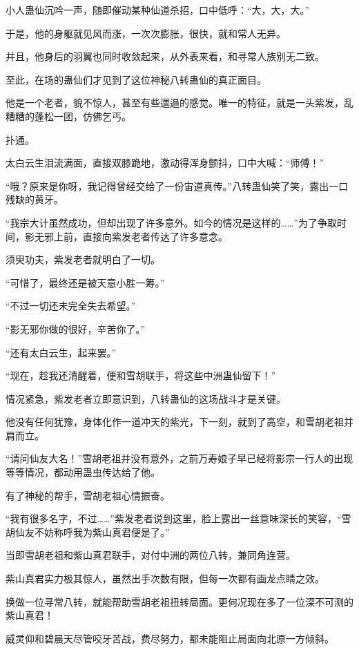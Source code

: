 
\begin{this_body}

小人蛊仙沉吟一声，随即催动某种仙道杀招，口中低呼：“大，大，大。”

于是，他的身躯就见风而涨，一次次膨胀，很快，就和常人无异。

并且，他身后的羽翼也同时收敛起来，从外表来看，和寻常人族别无二致。

至此，在场的蛊仙们才见到了这位神秘八转蛊仙的真正面目。

他是一个老者，貌不惊人，甚至有些邋遢的感觉。唯一的特征，就是一头紫发，乱糟糟的蓬松一团，仿佛乞丐。

扑通。

太白云生泪流满面，直接双膝跪地，激动得浑身颤抖，口中大喊：“师傅！”

“哦？原来是你呀，我记得曾经交给了一份宙道真传。”八转蛊仙笑了笑，露出一口残缺的黄牙。

“我宗大计虽然成功，但却出现了许多意外。如今的情况是这样的……”为了争取时间，影无邪上前，直接向紫发老者传达了许多意念。

须臾功夫，紫发老者就明白了一切。

“可惜了，最终还是被天意小胜一筹。”

“不过一切还未完全失去希望。”

“影无邪你做的很好，辛苦你了。”

“还有太白云生，起来罢。”

“现在，趁我还清醒着，便和雪胡联手，将这些中洲蛊仙留下！”

情况紧急，紫发老者立即意识到，八转蛊仙的这场战斗才是关键。

他没有任何犹豫，身体化作一道冲天的紫光，下一刻，就到了高空，和雪胡老祖并肩而立。

“请问仙友大名！”雪胡老祖并没有意外，之前万寿娘子早已经将影宗一行人的出现等等情况，都动用蛊虫传达给了他。

有了神秘的帮手，雪胡老祖心情振奋。

“我有很多名字，不过……”紫发老者说到这里，脸上露出一丝意味深长的笑容，“雪胡仙友不妨称呼我为紫山真君便是了。”

当即雪胡老祖和紫山真君联手，对付中洲的两位八转，兼同角连营。

紫山真君实力极其惊人，虽然出手次数有限，但每一次都有画龙点睛之效。

换做一位寻常八转，就能帮助雪胡老祖扭转局面。更何况现在多了一位深不可测的紫山真君！

威灵仰和碧晨天尽管咬牙苦战，费尽努力，都未能阻止局面向北原一方倾斜。


\end{this_body}
